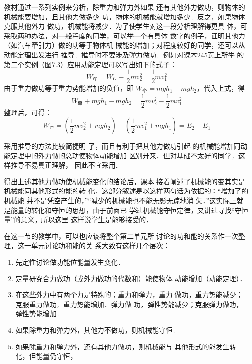 教材通过一系列实例来分析，除重力和弹力外如果
还有其他外力做功，则物体的机械能要增加，且其他力做多少
功，物体的机械能就增加多少．反之，如果物体克服其他外力
做功，机械能将减少．为了使学生对这一段分析理解得更具
体，可采取两种办法，对一般程度的同学，可以举一个有具体
数字的例子，证明其他力（如汽车牵引力）做的功等于物体机
械能的增加；对程度较好的同学，还可以从动能定理出发进行
推导．推导时不要涉及弹力做功．例如对课本245页上所举
的第二个实例（图7.3）应用动能定理可以写出如下的式子：
\[W_{\text{牵}}+W_G=\frac{1}{2}mv^2_2-\frac{1}{2}mv^2_1\]
由于重力做功等于重力势能增加的负值，即
$W_{\text{牵}}=mgh_1-mgh_2$，代入上式，得
\[W_{\text{牵}}+mgh_1-mgh_2 =\frac{1}{2}mv^2_2-\frac{1}{2}mv^2_1 \]
整理后，可得：
\[W_{\text{牵}}=\left(\frac{1}{2}mv^2_2+mgh_2\right)-\left(\frac{1}{2}mv^2_1+mgh_1\right)=E_2-E_1\]
\begin{figure}[htp]
    \centering
{}
    
    \caption{}
\end{figure}


采用推导的方法比较简捷明
了，而且有利于把其他力做功引起
的机械能增加同动能定理中的外力做的总功使物体动能增加
区别开来．但对基础不太好的同学，这样推导不易真正理解，
因此不宜采用．

得出上述其他力做功使机械能变化的结论后，课本
接着阐述了机械能的变其实是机械能同其他形式的能的转
化．这部分叙述是以这样两句话为依据的：“增加了的机械能
并不是凭空产生的，”“减少的机械能也不能无影无踪地消
失．”这实际上就是能量的转化和守恒的思想，由于前面已
学过机械能守恒定律，又讲过寻找“守恒量”的意义，所以这里
这样说学生是能够接受的．

在这一节的教学中，可以也应该将整个第二单元所
讨论的功和能的关系作一次整理，这一单元讨论功和能的关
系大致有这样几个层次：

\begin{enumerate}
    \item 先定性讨论做功能位能量发生变化．
    \item 定量研究合力做功（或外力做功的代数和）能使物体
    动能增加（动能定理）．
    \item 在这些外力中有两个力是特殊的；重力和弹力，重力
    做功，重力势能减少；克服重力做功，重力势能增加．弹力做
    功，弹性势能减少；克服弹力做功，弹性势能增加．
    \item 如果除重力和弹力外，其他力不做功，则机械能守恒．
    \item 如果除重力和弹力外，还有其他力做功，则机械能与
    其他形式的能发生转化，但能量仍守恒，
\end{enumerate}

